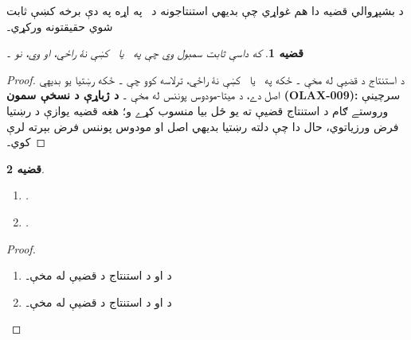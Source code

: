 \documentclass[12pt,a4paper,oneside]{report}
\newcommand{\olfileid}[3]{\gdef\pspart{#1}\gdef\pschapter{#2}\gdef\pssection{#3}}
\gdef\pspart{#2}\gdef\pschapter{#3}\gdef\pssection{}%
\newcommand{\ollabel}[1]{\label{\pspart:\pschapter:\pssection:#1}}
\newtheorem{thm}{قضيه}[chapter]
\newtheorem{prop}[thm]{قضيه}
\theoremstyle{definition}
\newenvironment{explain}{}{}
\begin{document}
\label{olpseg:OLP-0123-B005:start}
\olfileid{fol}{axd}{qpr}
\label{olpseg:OLP-0123-B005:end}

\label{olpseg:OLP-0123-B006:start}
\label{olpseg:OLP-0123-B006:end}

\label{olpseg:OLP-0123-B007:start}
\begin{explain}
  د بشپړوالي قضيه دا هم غواړي چې بديهي استنتاجونه د~\LR{$\Proves$} په
  اړه په دې برخه کښې ثابت شوي حقيقتونه ورکړي۔
\end{explain}
\label{olpseg:OLP-0123-B007:end}

\label{olpseg:OLP-0123-B008:start}
\begin{thm}
\ollabel{thm:strong-generalization} که  داسې ثابت سمبول وي چې
په~\LR{$\Gamma$} يا~ کښې نۀ راځي، او  وي،
نو \LR{$\Gamma \Proves \lforall[x][!A(x)]$}۔
\end{thm}
\label{olpseg:OLP-0123-B008:end}

\label{olpseg:OLP-0123-B009:start}
\begin{proof}
د استنتاج د قضیې له مخې ۔ ځکه
 په~\LR{$\Gamma$} يا~\LR{$\top$} کښې نۀ راځي، ترلاسه کوو چې
\LR{$\Gamma \Proves \ltrue \lif \lforall[x][!A(x)]$}۔ ځکه رښتيا يو
بديهي اصل دے، د ميتا-مودوس پوننس له مخې
\LR{$\Gamma \Proves \lforall[x][!A(x)]$}۔
\textbf{د ژباړې د نسخې سمون (OLAX-009):} سرچينې وروستے ګام د
استنتاج قضیې ته يو ځل بيا منسوب کړے و؛ هغه قضيه يوازې د رښتيا فرض
ورزياتوي، حال دا چې دلته رښتيا بديهي اصل او مودوس پوننس فرض بېرته
لرې کوي۔
\end{proof}
\label{olpseg:OLP-0123-B009:end}

\label{olpseg:OLP-0123-B010:start}
\begin{prop}
\ollabel{prop:provability-quantifiers}
\begin{enumerate}
\item {}.
\label{olpseg:OLP-0123-B010:end}

\label{olpseg:OLP-0123-B011:start}
\item {}.
\end{enumerate}
\end{prop}
\label{olpseg:OLP-0123-B011:end}

\label{olpseg:OLP-0123-B012:start}
\begin{proof}
\begin{enumerate}
\item د  او د استنتاج د قضیې له مخې۔
\item د  او د استنتاج د قضیې له مخې۔
\end{enumerate}
\end{proof}
\label{olpseg:OLP-0123-B012:end}
\end{document}
